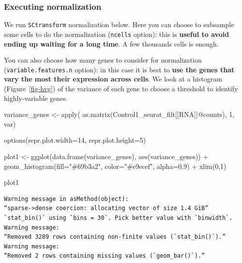 \documentclass[
  letterpaper,
  DIV=11,
  numbers=noendperiod]{scrartcl}
\newenvironment{Shaded}{}{}
\newcommand{\AttributeTok}[1]{\textcolor[rgb]{0.49,0.56,0.16}{#1}}
\newcommand{\DecValTok}[1]{\textcolor[rgb]{0.25,0.63,0.44}{#1}}
\newcommand{\FloatTok}[1]{\textcolor[rgb]{0.25,0.63,0.44}{#1}}
\newcommand{\FunctionTok}[1]{\textcolor[rgb]{0.02,0.16,0.49}{#1}}
\newcommand{\NormalTok}[1]{#1}
\newcommand{\OtherTok}[1]{\textcolor[rgb]{0.00,0.44,0.13}{#1}}
\newcommand{\SpecialCharTok}[1]{\textcolor[rgb]{0.25,0.44,0.63}{#1}}
\newcommand{\StringTok}[1]{\textcolor[rgb]{0.25,0.44,0.63}{#1}}
\begin{document}
\subsubsection{Executing normalization}\label{executing-normalization}

We run \texttt{SCtransform} normalization below. Here you can choose to
subsample some cells to do the normalization (\texttt{ncells} option):
this is \textbf{useful to avoid ending up waiting for a long time}. A
few thousands cells is enough.

You can also choose how many genes to consider for normalization
(\texttt{variable.features.n} option): in this case it is best to
\textbf{use the genes that vary the most their expression across cells}.
We look at a histogram (Figure~\ref{fig-hvg}) of the variance of each
gene to choose a threshold to identify highly-variable genes.

\begin{Shaded}
\begin{Highlighting}[]
\NormalTok{variance\_genes }\OtherTok{\textless{}{-}} \FunctionTok{apply}\NormalTok{( }\FunctionTok{as.matrix}\NormalTok{(Control1\_seurat\_filt[[}\StringTok{\textquotesingle{}RNA\textquotesingle{}}\NormalTok{]]}\SpecialCharTok{@}\NormalTok{counts), }\DecValTok{1}\NormalTok{, var)}

\FunctionTok{options}\NormalTok{(}\AttributeTok{repr.plot.width=}\DecValTok{14}\NormalTok{, }\AttributeTok{repr.plot.height=}\DecValTok{5}\NormalTok{)}

\NormalTok{plot1 }\OtherTok{\textless{}{-}} \FunctionTok{ggplot}\NormalTok{(}\FunctionTok{data.frame}\NormalTok{(variance\_genes), }\FunctionTok{aes}\NormalTok{(variance\_genes)) }\SpecialCharTok{+} 
     \FunctionTok{geom\_histogram}\NormalTok{(}\AttributeTok{fill=}\StringTok{"\#69b3a2"}\NormalTok{, }\AttributeTok{color=}\StringTok{"\#e9ecef"}\NormalTok{, }\AttributeTok{alpha=}\FloatTok{0.9}\NormalTok{) }\SpecialCharTok{+} \FunctionTok{xlim}\NormalTok{(}\DecValTok{0}\NormalTok{,}\DecValTok{1}\NormalTok{)}

\NormalTok{plot1}
\end{Highlighting}
\end{Shaded}

\begin{verbatim}
Warning message in asMethod(object):
“sparse->dense coercion: allocating vector of size 1.4 GiB”
`stat_bin()` using `bins = 30`. Pick better value with `binwidth`.
Warning message:
“Removed 3289 rows containing non-finite values (`stat_bin()`).”
Warning message:
“Removed 2 rows containing missing values (`geom_bar()`).”
\end{verbatim}
\end{document}
